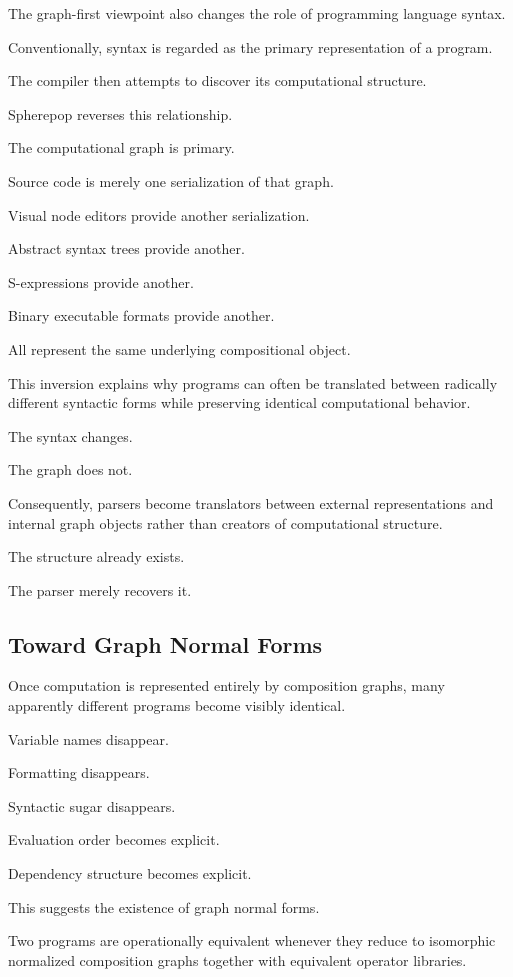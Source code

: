 \documentclass[12pt,oneside]{article}
\begin{document}
The graph-first viewpoint also changes the role of programming language syntax.

Conventionally, syntax is regarded as the primary representation of a program.

The compiler then attempts to discover its computational structure.

Spherepop reverses this relationship.

The computational graph is primary.

Source code is merely one serialization of that graph.

Visual node editors provide another serialization.

Abstract syntax trees provide another.

S-expressions provide another.

Binary executable formats provide another.

All represent the same underlying compositional object.

This inversion explains why programs can often be translated between radically different syntactic forms while preserving identical computational behavior.

The syntax changes.

The graph does not.

Consequently, parsers become translators between external representations and internal graph objects rather than creators of computational structure.

The structure already exists.

The parser merely recovers it.

\subsection{Toward Graph Normal Forms}

Once computation is represented entirely by composition graphs, many apparently different programs become visibly identical.

Variable names disappear.

Formatting disappears.

Syntactic sugar disappears.

Evaluation order becomes explicit.

Dependency structure becomes explicit.

This suggests the existence of graph normal forms.

Two programs are operationally equivalent whenever they reduce to isomorphic normalized composition graphs together with equivalent operator libraries.
\end{document}
